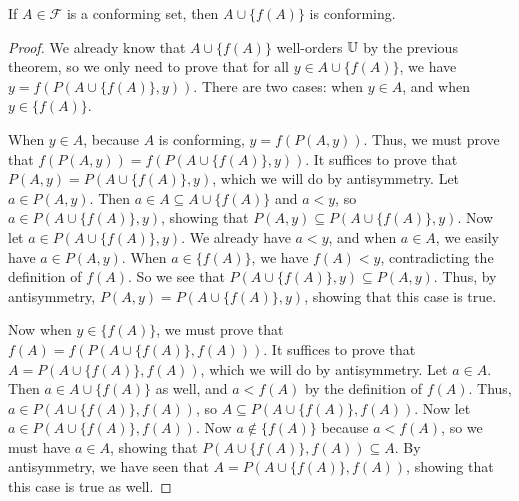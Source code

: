 \documentclass[../math.tex]{subfiles}
\begin{document}
\begin{lemma} \label{conforming_add_conforming}
    If $A \in \mathcal F$ is a conforming set, then $A \cup \{f(A)\}$ is
    conforming.
\end{lemma}
\begin{proof}
    We already know that $A \cup \{f(A)\}$ well-orders $\mathbb{U}$ by the previous
    theorem, so we only need to prove that for all $y \in A \cup \{f(A)\}$, we
    have $y = f(P(A \cup \{f(A)\}, y))$.  There are two cases: when $y
    \in A$, and when $y \in \{f(A)\}$.

    When $y \in A$, because $A$ is conforming, $y = f(P(A, y))$.  Thus, we must
    prove that $f(P(A, y)) = f(P(A \cup \{f(A)\}, y))$.  It suffices to prove
    that $P(A, y) = P(A \cup \{f(A)\}, y)$, which we will do by antisymmetry.
    Let $a \in P(A, y)$.  Then $a \in A \subseteq A \cup \{f(A)\}$ and $a < y$,
    so $a \in P(A \cup \{f(A)\}, y)$, showing that $P(A, y) \subseteq P(A \cup
    \{f(A)\}, y)$.  Now let $a \in P(A \cup \{f(A)\}, y)$.  We already have $a <
    y$, and when $a \in A$, we easily have $a \in P(A, y)$.
    When $a \in \{f(A)\}$, we have $f(A) < y$, contradicting the definition of
    $f(A)$.  So we see that $P(A \cup \{f(A)\}, y) \subseteq P(A, y)$.  Thus, by
    antisymmetry, $P(A, y) = P(A \cup \{f(A)\}, y)$, showing that this case is
    true.

    Now when $y \in \{f(A)\}$, we must prove that $f(A) = f(P(A \cup \{f(A)\},
    f(A)))$.  It suffices to prove that $A = P(A \cup \{f(A)\}, f(A))$, which we
    will do by antisymmetry.  Let $a \in A$.  Then $a \in A \cup \{f(A)\}$ as
    well, and $a < f(A)$ by the definition of $f(A)$.  Thus, $a \in P(A \cup
    \{f(A)\}, f(A))$, so $A \subseteq P(A \cup \{f(A)\}, f(A))$.  Now let $a \in
    P(A \cup \{f(A)\}, f(A))$.  Now $a \notin \{f(A)\}$ because $a < f(A)$, so
    we must have $a \in A$, showing that $P(A \cup \{f(A)\}, f(A)) \subseteq A$.
    By antisymmetry, we have seen that $A = P(A \cup \{f(A)\}, f(A))$, showing
    that this case is true as well.
\end{proof}
\end{document}
